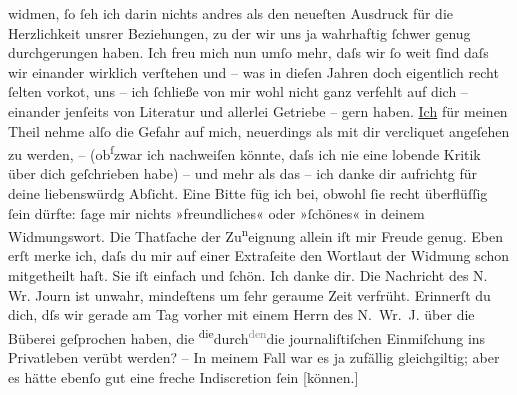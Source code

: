 \begin{ledgroupsized}[t]{13cm}
               widmen, ſo ſeh ich darin nichts andres als den neueſten Ausdruck für die Herzlichkeit
               unsrer Beziehungen, zu der wir uns ja wahrhaftig ſchwer genug durchgerungen haben.
               Ich freu mich nun umſo mehr, daſs wir ſo weit ſind daſs wir einander wirklich
               verſtehen und – was in dieſen Jahren {\pb}doch eigentlich recht
               ſelten vorko{\geminationm}t, uns – ich ſchließe von mir wohl nicht
               ganz verfehlt auf dich – einander jenſeits von Literatur und allerlei Getriebe – gern
               haben. \uline{Ich} für meinen Theil nehme alſo die Gefahr auf
               mich, neuerdings als mit dir vercliquet angeſehen zu werden, \introOben{}–\introOben{} (ob\substVorne{}\textsuperscript{ſ}\substDazwischen{}z\substHinten{}war ich nachweiſen könnte, daſs ich nie eine lobende Kritik über dich
               geſchrieben habe) – und {\pb}mehr als das – ich danke dir aufrichtg für deine liebenswürdg Abſicht. Eine Bitte
               füg ich bei, obwohl ſie recht überflüſſig ſein dürfte: ſage mir nichts »freundliches«
               oder »ſchönes« in deinem Widmungswort. Die Thatſache der Zu\substVorne{}\textsuperscript{n}\substDazwischen{}ei\substHinten{}gnung allein iſt mir Freude genug.\pend
           \pstart
           Eben erſt merke ich, daſs du mir auf einer Extraſeite den Wortlaut der Widmung schon
               mitgetheilt haſt. Sie iſt einfach und ſchön. Ich danke dir.\pend
           \pstart
           {\pb}Die Nachricht des N. Wr. Journ ist unwahr, mindeſtens um ſehr geraume
               Zeit verfrüht. Erinnerſt du dich, dſs wir gerade am Tag vorher mit einem Herrn des N. Wr. J. über die Büberei geſprochen haben, die \substVorne{}\textsuperscript{die}\substDazwischen{}durch\substHinten{}{ }\substVorne{}\textsuperscript{\textcolor{gray}{den}}\substDazwischen{}die\substHinten{} journaliſtiſchen Einmiſchung ins Privatleben verübt werden? – In meinem Fall
               war es ja zufällig gleichgiltig; aber es hätte ebenſo gut eine freche Indiscretion
               ſein {[}können.{]}\pend
           \pstart

\end{ledgroupsized}
